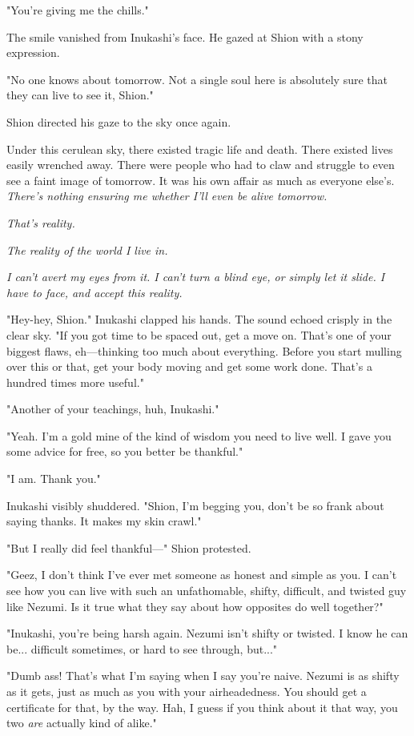 "You're giving me the chills."

The smile vanished from Inukashi's face. He gazed at Shion with a stony
expression.

"No one knows about tomorrow. Not a single soul here is absolutely sure
that they can live to see it, Shion."

Shion directed his gaze to the sky once again.

Under this cerulean sky, there existed tragic life and death. There
existed lives easily wrenched away. There were people who had to claw
and struggle to even see a faint image of tomorrow. It was his own
affair as much as everyone else's. \emph{There's nothing ensuring me whether
I'll even be alive tomorrow.}

\emph{That's reality.}

\emph{The reality of the world I live in.}

\emph{I can't avert my eyes from it. I can't turn a blind eye, or simply let
it slide. I have to face, and accept this reality.}

"Hey-hey, Shion." Inukashi clapped his hands. The sound echoed crisply
in the clear sky. "If you got time to be spaced out, get a move on.
That's one of your biggest flaws, eh---thinking too much about everything.
Before you start mulling over this or that, get your body moving and get
some work done. That's a hundred times more useful."

"Another of your teachings, huh, Inukashi."

"Yeah. I'm a gold mine of the kind of wisdom you need to live well. I
gave you some advice for free, so you better be thankful."

"I am. Thank you."

Inukashi visibly shuddered. "Shion, I'm begging you, don't be so frank
about saying thanks. It makes my skin crawl."

"But I really did feel thankful---" Shion protested.

"Geez, I don't think I've ever met someone as honest and simple as you.
I can't see how you can live with such an unfathomable, shifty,
difficult, and twisted guy like Nezumi. Is it true what they say about
how opposites do well together?"

"Inukashi, you're being harsh again. Nezumi isn't shifty or twisted. I
know he can be... difficult sometimes, or hard to see through, but..."

"Dumb ass! That's what I'm saying when I say you're naive. Nezumi is as
shifty as it gets, just as much as you with your airheadedness. You
should get a certificate for that, by the way. Hah, I guess if you think
about it that way, you two \emph{are} actually kind of alike."


